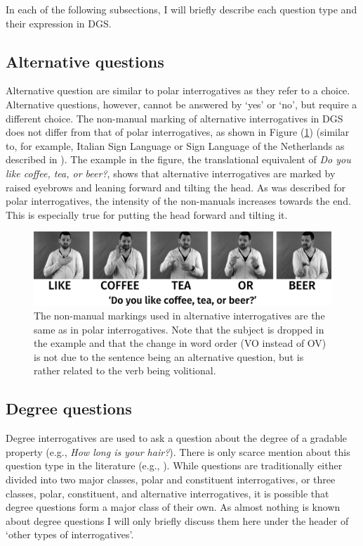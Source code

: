 \noindent In each of the following subsections, I will briefly describe each question type and their expression in DGS.

\subsection{Alternative questions}
Alternative question are similar to polar interrogatives as they refer to a choice. Alternative questions, however, cannot be answered by `yes' or `no', but require a different choice. The non-manual marking of alternative interrogatives in DGS does not differ from that of polar interrogatives, as shown in Figure (\ref{alternativequestion}) (similar to, for example, Italian Sign Language or Sign Language of the Netherlands as described in \citealt{brunelli2011antisymmetry}). The example in the figure, the translational equivalent of \textit{Do you like coffee, tea, or beer?}, shows that alternative interrogatives are marked by raised eyebrows and leaning forward and tilting the head. As was described for polar interrogatives, the intensity of the non-manuals increases towards the end. This is especially true for putting the head forward and tilting it.


\begin{figure}[bt]
\centering
	\includegraphics[width=1.0\textwidth]{alternativequestionsw.jpg}
	\caption{The non-manual markings used in alternative interrogatives are the same as in polar interrogatives. Note that the subject is dropped in the example and that the change in word order (VO instead of OV) is not due to the sentence being an alternative question, but is rather related to the verb being volitional.}
	\label{alternativequestion}
\end{figure}



\subsection{Degree questions}
Degree interrogatives are used to ask a question about the degree of a gradable property (e.g., \textit{How long is your hair?}). There is only scarce mention about this question type in the literature (e.g., \citealt{meier2001result, abrusan2011wh, tiemann2012crosslinguistic}). While questions are traditionally either divided into two major classes, polar and constituent interrogatives, or three classes, polar, constituent, and alternative interrogatives, it is possible that degree questions form a major class of their own. As almost nothing is known about degree questions I will only briefly discuss them here under the header of `other types of interrogatives'.

